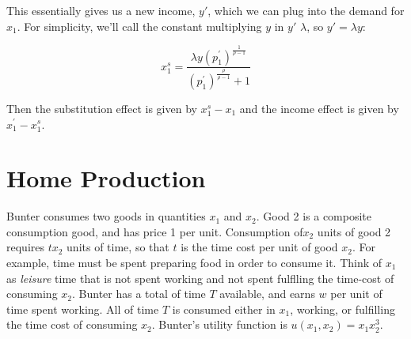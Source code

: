 \documentclass{article}
\begin{document}
This essentially gives us a new income, $y'$, which we can plug into the demand for $x_1$. For simplicity, we'll call the constant multiplying $y$ in $y'$ $\lambda$, so $y' = \lambda y$:

\[ x_1^s =  \frac{\lambda y \left( p_1^{'} \right)^{\frac1{\rho - 1}}}{\left( p_1^{'} \right)^{\frac{\rho}{\rho - 1}} + 1}\]

Then the substitution effect is given by $x_1^s - x_1$ and the income effect is given by $x_1^{'} - x_1^s$.

\color{black} 

\section{Home Production}

Bunter consumes two goods in quantities $x_1$ and $x_2$. Good 2 is a composite consumption good, and  has price 1 per unit. Consumption of$x_2$ units of good 2 requires $tx_2$ units of time, so that $t $ is the time cost per unit of good $x_2$. For example, time must be spent preparing food in order to consume it. Think of $x_1$ as {\em leisure} time that is not spent working and not spent fulflling the time-cost of consuming $x_2$. Bunter has a total of time $T$ available, and earns $w$ per unit of time spent working. All of time $T$ is consumed either in $x_1$, working, or fulfilling the time cost of consuming $x_2$. Bunter's utility function is $u(x_1, x_2) = x_1x_2^3$.
\end{document}
